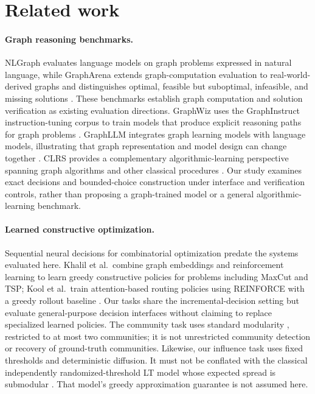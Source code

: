 \section{Related work}
\label{sec:related-work}
\paragraph{Graph reasoning benchmarks.}
NLGraph evaluates language models on graph problems expressed in natural
language, while GraphArena extends graph-computation evaluation to
real-world-derived graphs and distinguishes optimal, feasible but
suboptimal, infeasible, and missing solutions
\cite{wang2023nlgraph,tang2025grapharena}.
These benchmarks establish graph computation and solution verification
as existing evaluation directions.
GraphWiz uses the GraphInstruct instruction-tuning corpus to train models
that produce explicit reasoning paths for graph problems
\cite{chen2024graphwiz}. GraphLLM integrates graph learning models with
language models, illustrating that graph representation and model design
can change together \cite{chai2023graphllm}.
CLRS provides a complementary algorithmic-learning perspective spanning
graph algorithms and other classical procedures \cite{velickovic2022clrs}.
Our study examines exact decisions and bounded-choice construction under
interface and verification controls, rather than proposing a graph-trained
model or a general algorithmic-learning benchmark.

\paragraph{Learned constructive optimization.}
Sequential neural decisions for combinatorial optimization predate the
systems evaluated here. Khalil et al.\ combine graph embeddings and
reinforcement learning to learn greedy constructive policies for problems
including MaxCut and TSP; Kool et al.\ train attention-based routing policies
using REINFORCE with a greedy rollout baseline
\cite{khalil2017learning,kool2019attention}.
Our tasks share the incremental-decision setting but evaluate general-purpose
decision interfaces without claiming to replace specialized learned policies.
The community task uses standard modularity \cite{newman2004community},
restricted to at most two communities; it is not unrestricted community
detection or recovery of ground-truth communities. Likewise, our influence
task uses fixed thresholds and deterministic diffusion. It must not be
conflated with the classical independently randomized-threshold LT model
whose expected spread is submodular \cite{kempe2015influence}.
That model's greedy approximation guarantee is not assumed here.

